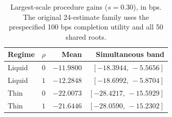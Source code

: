 \begin{table}[t]\centering\small
\begin{tabular}{llrr}\toprule
Regime & $\rho$ & Mean & Simultaneous band \\
\midrule
Liquid & $0$ & $-11.9800$ & $[-18.3944,\,-5.5656]$ \\
Liquid & $1$ & $-12.2848$ & $[-18.6992,\,-5.8704]$ \\
Thin & $0$ & $-22.0073$ & $[-28.4217,\,-15.5929]$ \\
Thin & $1$ & $-21.6446$ & $[-28.0590,\,-15.2302]$ \\
\bottomrule\end{tabular}
\caption{Largest-scale procedure gains ($s=0.30$), in bps. The original 24-estimate family uses the prespecified 100 bps completion utility and all 50 shared roots.}\label{tab:largest}
\end{table}
